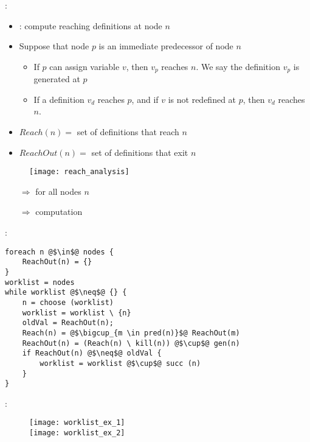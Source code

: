  :

\begin{itemize}
    \item {} : compute reaching definitions at node $n$
    \item Suppose that node $p$ is an immediate predecessor of node $n$
    \begin{itemize}
    \item If $p$ can assign variable $v$, then $v_p$ reaches $n$. We say the definition $v_p$ is generated at $p$
    \item If a definition $v_d$ reaches $p$, and if $v$ is not redefined at $p$, then $v_d$ reaches $n$.
    \end{itemize}
    \item $Reach(n) =$ set of definitions that reach $n$
    \item $ReachOut(n) =$ set of definitions that exit $n$
\end{itemize}
\begin{figure}[H]
    \centering
    \texttt{[image: reach\_analysis]}
\end{figure}
\begin{itemize}
    \item[$\Rightarrow$]  for all nodes $n$
    \item[$\Rightarrow$]  computation
\end{itemize}

 :
\begin{minipage}{0.48\textwidth}

\end{minipage}
\begin{verbatim}
foreach n @$\in$@ nodes {
    ReachOut(n) = {}
}
worklist = nodes
while worklist @$\neq$@ {} {
    n = choose (worklist)
    worklist = worklist \ {n}
    oldVal = ReachOut(n);
    Reach(n) = @$\bigcup_{m \in pred(n)}$@ ReachOut(m)
    ReachOut(n) = (Reach(n) \ kill(n)) @$\cup$@ gen(n)
    if ReachOut(n) @$\neq$@ oldVal {
        worklist = worklist @$\cup$@ succ (n)
    }
}
\end{verbatim}

\newpage
{} :
\begin{figure}[H]
    \centering
    \texttt{[image: worklist\_ex\_1]}\\
    \texttt{[image: worklist\_ex\_2]}
\end{figure}


